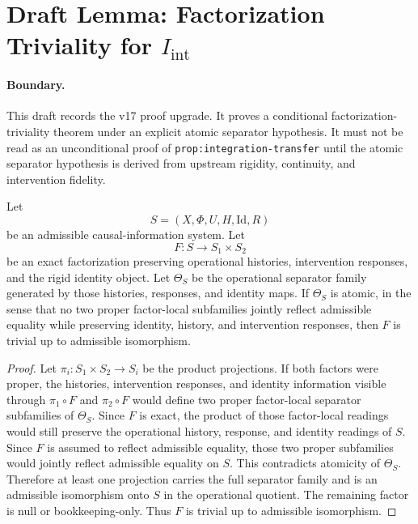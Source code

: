 \section*{Draft Lemma: Factorization Triviality for \(I_{\mathrm{int}}\)}

\paragraph{Boundary.}
This draft records the v17 proof upgrade. It proves a conditional
factorization-triviality theorem under an explicit atomic separator hypothesis.
It must not be read as an unconditional proof of
\texttt{prop:integration-transfer} until the atomic separator hypothesis is
derived from upstream rigidity, continuity, and intervention fidelity.

\begin{lemma}
Let
\[
S=(X,\Phi,U,H,\mathrm{Id},R)
\]
be an admissible causal-information system. Let
\[
F:S\to S_1\times S_2
\]
be an exact factorization preserving operational histories, intervention
responses, and the rigid identity object. Let \(\Theta_S\) be the operational
separator family generated by those histories, responses, and identity maps.
If \(\Theta_S\) is atomic, in the sense that no two proper factor-local
subfamilies jointly reflect admissible equality while preserving identity,
history, and intervention responses, then \(F\) is trivial up to admissible
isomorphism.
\end{lemma}

\begin{proof}
Let \(\pi_i:S_1\times S_2\to S_i\) be the product projections. If both factors
were proper, the histories, intervention responses, and identity information
visible through \(\pi_1\circ F\) and \(\pi_2\circ F\) would define two proper
factor-local separator subfamilies of \(\Theta_S\). Since \(F\) is exact, the
product of those factor-local readings would still preserve the operational
history, response, and identity readings of \(S\). Since \(F\) is assumed to
reflect admissible equality, those two proper subfamilies would jointly reflect
admissible equality on \(S\). This contradicts atomicity of \(\Theta_S\).
Therefore at least one projection carries the full separator family and is an
admissible isomorphism onto \(S\) in the operational quotient. The remaining
factor is null or bookkeeping-only. Thus \(F\) is trivial up to admissible
isomorphism.
\end{proof}

